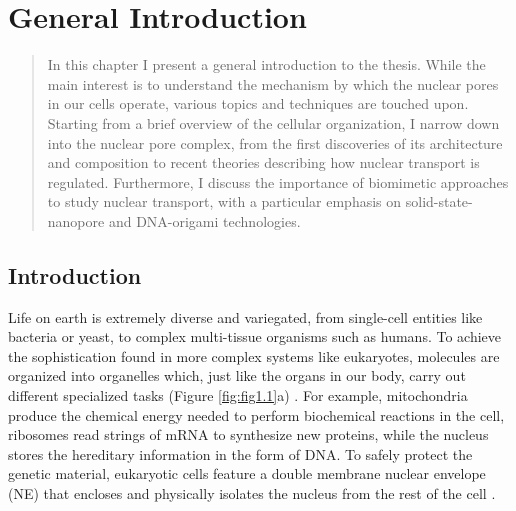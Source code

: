 \chapter[General Introduction]{General Introduction}
\label{chapter_1}

%
%
%

\begin{abstract}
	In this chapter I present a general introduction to the thesis. While the main interest is to understand the mechanism by which the nuclear pores in our cells operate, various topics and techniques are touched upon. Starting from a brief overview of the cellular organization, I narrow down into the nuclear pore complex, from the first discoveries of its architecture and composition to recent theories describing how nuclear transport is regulated. Furthermore, I discuss the importance of biomimetic approaches to study nuclear transport, with a particular emphasis on solid-state-nanopore and DNA-origami technologies.
\end{abstract}

\newpage
\section[Introduction]{Introduction}
Life on earth is extremely diverse and variegated, from single-cell entities like  bacteria or yeast, to complex multi-tissue organisms such as humans. To achieve the sophistication found in more complex systems like eukaryotes, molecules are organized into organelles which, just like the organs in our body, carry out different specialized tasks (Figure \ref{fig:fig1.1}a) \cite{Lodish2000}. For example, mitochondria produce the chemical energy needed to perform biochemical reactions in the cell, ribosomes read strings of mRNA to synthesize new proteins, while the nucleus stores the hereditary information in the form of DNA\cite{Nelson2008}. To safely protect the genetic material, eukaryotic cells feature a double membrane nuclear envelope (NE) that encloses and physically isolates the nucleus from the rest of the cell \cite{Hetzer2010}.


